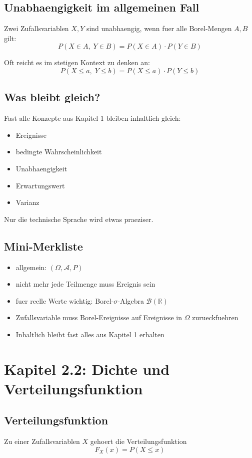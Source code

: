 \documentclass[a4paper,11pt]{article}
\begin{document}
\subsection{Unabhaengigkeit im allgemeinen Fall}
Zwei Zufallsvariablen $X,Y$ sind unabhaengig, wenn fuer alle Borel-Mengen $A,B$ gilt:
\[
P(X\in A,\;Y\in B)=P(X\in A)\cdot P(Y\in B)
\]

Oft reicht es im stetigen Kontext zu denken an:
\[
P(X\le a,\;Y\le b)=P(X\le a)\cdot P(Y\le b)
\]

\subsection{Was bleibt gleich?}
Fast alle Konzepte aus Kapitel 1 bleiben inhaltlich gleich:
\begin{itemize}
  \item Ereignisse
  \item bedingte Wahrscheinlichkeit
  \item Unabhaengigkeit
  \item Erwartungswert
  \item Varianz
\end{itemize}

Nur die technische Sprache wird etwas praeziser.

\subsection{Mini-Merkliste}
\begin{itemize}
  \item allgemein: $\displaystyle (\Omega,\mathcal A,P)$
  \item nicht mehr jede Teilmenge muss Ereignis sein
  \item fuer reelle Werte wichtig: Borel-$\sigma$-Algebra $\mathcal B(\mathbb R)$
  \item Zufallsvariable muss Borel-Ereignisse auf Ereignisse in $\Omega$ zurueckfuehren
  \item Inhaltlich bleibt fast alles aus Kapitel 1 erhalten
\end{itemize}

\section{Kapitel 2.2: Dichte und Verteilungsfunktion}

\subsection{Verteilungsfunktion}
Zu einer Zufallsvariablen $X$ gehoert die Verteilungsfunktion
\[
F_X(x)=P(X\le x)
\]
\end{document}
